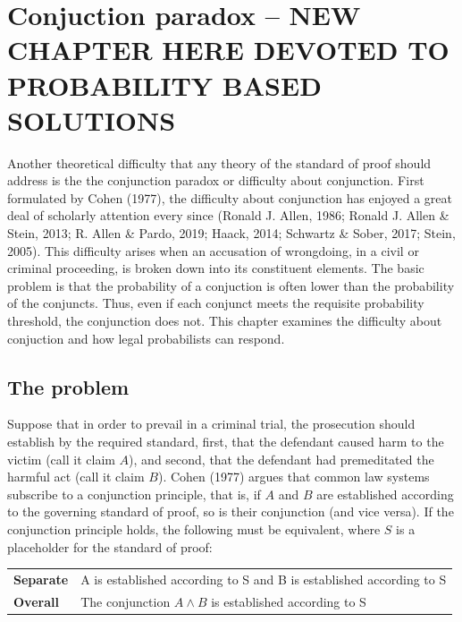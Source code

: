 \documentclass[
  10pt,
  dvipsnames,enabledeprecatedfontcommands]{scrartcl}
\newcommand{\et}{\wedge}
\begin{document}
\hypertarget{conjuction-paradox-new-chapter-here-devoted-to-probability-based-solutions}{%
\section{Conjuction paradox -- NEW CHAPTER HERE DEVOTED TO PROBABILITY
BASED
SOLUTIONS}\label{conjuction-paradox-new-chapter-here-devoted-to-probability-based-solutions}}

Another theoretical difficulty that any theory of the standard of proof
should address is the the conjunction paradox or difficulty about
conjunction. First formulated by Cohen (1977), the difficulty about
conjunction has enjoyed a great deal of scholarly attention every since
(Ronald J. Allen, 1986; Ronald J. Allen \& Stein, 2013; R. Allen \&
Pardo, 2019; Haack, 2014; Schwartz \& Sober, 2017; Stein, 2005). This
difficulty arises when an accusation of wrongdoing, in a civil or
criminal proceeding, is broken down into its constituent elements. The
basic problem is that the probability of a conjuction is often lower
than the probability of the conjuncts. Thus, even if each conjunct meets
the requisite probability threshold, the conjunction does not. This
chapter examines the difficulty about conjuction and how legal
probabilists can respond.

\hypertarget{the-problem}{%
\subsection{The problem}\label{the-problem}}

Suppose that in order to prevail in a criminal trial, the prosecution
should establish by the required standard, first, that the defendant
caused harm to the victim (call it claim \(A\)), and second, that the
defendant had premeditated the harmful act (call it claim \(B\)). Cohen
(1977) argues that common law systems subscribe to a conjunction
principle, that is, if \(A\) and \(B\) are established according to the
governing standard of proof, so is their conjunction (and vice versa).
If the conjunction principle holds, the following must be equivalent,
where \(S\) is a placeholder for the standard of proof:

\begin{center}
\begin{tabular}
{@{}ll@{}}
\toprule
\textbf{Separate} &   A is established according to S and B is established according to S\\   
\textbf{Overall}  &   The conjunction $A \et B$ is established according to S  \\ 
\bottomrule
\end{tabular}
\end{center}
\end{document}
